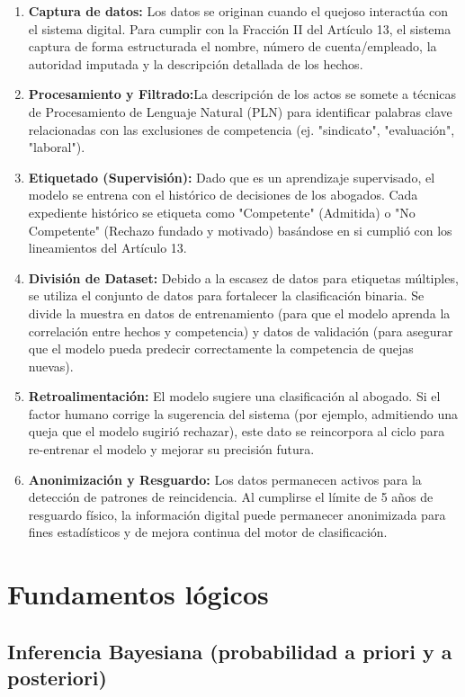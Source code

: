 \begin{enumerate}
    \item \textbf{Captura de datos:} Los datos se originan cuando el quejoso interactúa con el sistema digital. Para cumplir con la Fracción II del Artículo 13, el sistema captura de forma estructurada el nombre, número de cuenta/empleado, la autoridad imputada y la descripción detallada de los hechos.
    \item \textbf{Procesamiento y Filtrado:}La descripción de los actos se somete a técnicas de Procesamiento de Lenguaje Natural (PLN) para identificar palabras clave relacionadas con las exclusiones de competencia (ej. "sindicato", "evaluación", "laboral").
    \item \textbf{Etiquetado (Supervisión):} Dado que es un aprendizaje supervisado, el modelo se entrena con el histórico de decisiones de los abogados. Cada expediente histórico se etiqueta como "Competente" (Admitida) o "No Competente" (Rechazo fundado y motivado) basándose en si cumplió con los lineamientos del Artículo 13.
    \item \textbf{División de Dataset:} Debido a la escasez de datos para etiquetas múltiples, se utiliza el conjunto de datos para fortalecer la clasificación binaria. Se divide la muestra en datos de entrenamiento (para que el modelo aprenda la correlación entre hechos y competencia) y datos de validación (para asegurar que el modelo pueda predecir correctamente la competencia de quejas nuevas).
    \item \textbf{Retroalimentación:} El modelo sugiere una clasificación al abogado. Si el factor humano corrige la sugerencia del sistema (por ejemplo, admitiendo una queja que el modelo sugirió rechazar), este dato se reincorpora al ciclo para re-entrenar el modelo y mejorar su precisión futura.
    \item \textbf{Anonimización y Resguardo:} Los datos permanecen activos para la detección de patrones de reincidencia. Al cumplirse el límite de 5 años de resguardo físico, la información digital puede permanecer anonimizada para fines estadísticos y de mejora continua del motor de clasificación.
\end{enumerate}


\section{Fundamentos lógicos}

\subsection{Inferencia Bayesiana (probabilidad a priori y a posteriori)}

